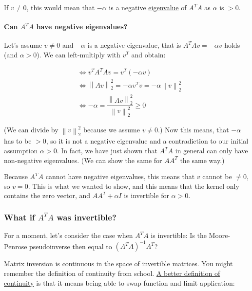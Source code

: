 \documentclass[]{scrartcl}
\let\oldparagraph\paragraph
\renewcommand{\paragraph}[1]{\oldparagraph{#1}\mbox{}}
\begin{document}
If \(v \ne 0\), this would mean that \(-\alpha\) is a negative
\href{https://en.wikipedia.org/wiki/Eigenvalues_and_eigenvectors}{eigenvalue}
of \(A^TA\) as \(\alpha\) is \(>0\).

\paragraph{\texorpdfstring{Can \(A^TA\) have negative
eigenvalues?}{Can A\^{}TA have negative eigenvalues?}}\label{can-ata-have-negative-eigenvalues}

Let's assume \(v \ne 0\) and \(-\alpha\) is a negative eigenvalue, that
is \(A^{T}Av = -\alpha v\) holds (and \(\alpha > 0\)). We can
left-multiply with \(v^T\) and obtain:

\[ 
\begin{align*} & \Leftrightarrow v^{T}A^{T}Av=v^{T}\left( -\alpha v\right) \\ & \Leftrightarrow \left\| Av\right\| _{2}^{2}=-\alpha v^{T}v=-\alpha \left\| v\right\| _{2}^{2}\\ & \Leftrightarrow -\alpha =\dfrac {\left\| Av\right\| _{2}^{2}} {\left\| v\right\| _{2}^{2}}\geq 0
\end{align*} 
\]

(We can divide by \(\left\| v\right\| _{2}^{2}\) because we assume
\(v\ne0\).) Now this means, that \(-\alpha\) has to be \(>0\), so it is
not a negative eigenvalue and a contradiction to our initial assumption
\(\alpha > 0\). In fact, we have just shown that \(A^TA\) in general can
only have non-negative eigenvalues. (We can show the same for \(AA^T\)
the same way.)

Because \(A^TA\) cannot have negative eigenvalues, this means that \(v\)
cannot be \(\ne 0\), so \(v = 0\). This is what we wanted to show, and
this means that the kernel only contains the zero vector, and
\(AA^T + \alpha I\) is invertible for \(\alpha > 0\).

\subsubsection{\texorpdfstring{What if \(A^T A\) was
invertible?}{What if A\^{}T A was invertible?}}\label{what-if-at-a-was-invertible}

For a moment, let's consider the case when \(A^T A\) is invertible: Is
the Moore-Penrose pseudoinverse then equal to
\(\left (A^T A \right)^{-1} A^T\)?

Matrix inversion is continuous in the space of invertible matrices. You
might remember the definition of continuity from school.
\href{https://en.wikipedia.org/wiki/Continuous_function\#Definition_in_terms_of_limits_of_sequences}{A
better definition of continuity} is that it means being able to swap
function and limit application:
\end{document}
